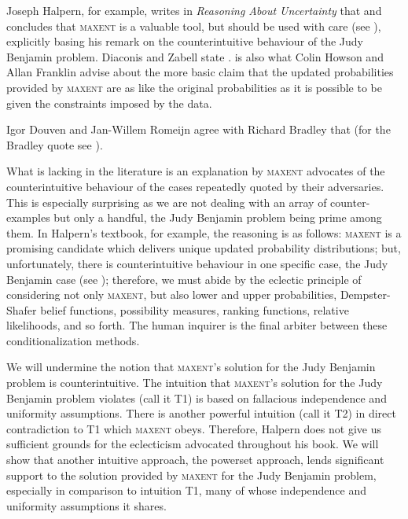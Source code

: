 \documentclass[12pt]{article}
\begin{document}
Joseph Halpern, for example, writes in \emph{Reasoning About
  Uncertainty} that   and
concludes that \textsc{maxent} is a valuable tool, but should be used
with care (see ), explicitly basing his
remark on the counterintuitive behaviour of the Judy Benjamin problem.
Diaconis and Zabell state 
. 
 is also what Colin Howson and Allan
Franklin advise about the more basic claim that the updated
probabilities provided by \textsc{maxent} are as like the original
probabilities as it is possible to be given the constraints imposed by
the data.

Igor Douven and Jan-Willem Romeijn agree with Richard Bradley that
  (for the
Bradley quote see ).

What is lacking in the literature is an explanation by \textsc{maxent}
advocates of the counterintuitive behaviour of the cases repeatedly
quoted by their adversaries. This is especially surprising as we are
not dealing with an array of counter-examples but only a handful, the
Judy Benjamin problem being prime among them. In Halpern's textbook,
for example, the reasoning is as follows: \textsc{maxent} is a
promising candidate which delivers unique updated probability
distributions; but, unfortunately, there is counterintuitive behaviour
in one specific case, the Judy Benjamin case (see
); therefore, we must abide by the
eclectic principle of considering not only \textsc{maxent}, but also
lower and upper probabilities, Dempster-Shafer belief functions,
possibility measures, ranking functions, relative likelihoods, and so
forth. The human inquirer is the final arbiter between these
conditionalization methods.

We will undermine the notion that \textsc{maxent}'s solution for the
Judy Benjamin problem is counterintuitive. The intuition that
\textsc{maxent}'s solution for the Judy Benjamin problem violates
(call it T1) is based on fallacious independence and uniformity
assumptions. There is another powerful intuition (call it T2) in
direct contradiction to T1 which \textsc{maxent} obeys. Therefore,
Halpern does not give us sufficient grounds for the eclecticism
advocated throughout his book. We will show that another intuitive
approach, the powerset approach, lends significant support to the
solution provided by \textsc{maxent} for the Judy Benjamin problem,
especially in comparison to intuition T1, many of whose independence
and uniformity assumptions it shares. 
\end{document}
